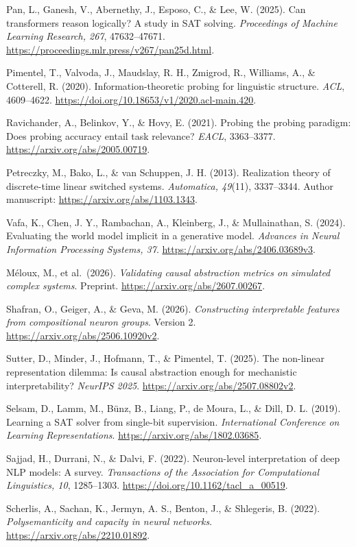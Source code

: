 \documentclass[
  british,
  11pt,
  a4paper,
]{article}
\begin{document}
Pan, L., Ganesh, V., Abernethy, J., Esposo, C., \& Lee, W. (2025). Can
transformers reason logically? A study in SAT solving. \emph{Proceedings
of Machine Learning Research, 267}, 47632--47671.
\url{https://proceedings.mlr.press/v267/pan25d.html}.

Pimentel, T., Valvoda, J., Maudslay, R. H., Zmigrod, R., Williams, A.,
\& Cotterell, R. (2020). Information-theoretic probing for linguistic
structure. \emph{ACL}, 4609--4622.
\url{https://doi.org/10.18653/v1/2020.acl-main.420}.

Ravichander, A., Belinkov, Y., \& Hovy, E. (2021). Probing the probing
paradigm: Does probing accuracy entail task relevance? \emph{EACL},
3363--3377. \url{https://arxiv.org/abs/2005.00719}.

Petreczky, M., Bako, L., \& van Schuppen, J. H. (2013). Realization
theory of discrete-time linear switched systems. \emph{Automatica,
49}(11), 3337--3344. Author manuscript:
\url{https://arxiv.org/abs/1103.1343}.

Vafa, K., Chen, J. Y., Rambachan, A., Kleinberg, J., \& Mullainathan, S.
(2024). Evaluating the world model implicit in a generative model.
\emph{Advances in Neural Information Processing Systems, 37}.
\url{https://arxiv.org/abs/2406.03689v3}.

Méloux, M., et al.~(2026). \emph{Validating causal abstraction metrics
on simulated complex systems}. Preprint.
\url{https://arxiv.org/abs/2607.00267}.

Shafran, O., Geiger, A., \& Geva, M. (2026). \emph{Constructing
interpretable features from compositional neuron groups}. Version 2.
\url{https://arxiv.org/abs/2506.10920v2}.

Sutter, D., Minder, J., Hofmann, T., \& Pimentel, T. (2025). The
non-linear representation dilemma: Is causal abstraction enough for
mechanistic interpretability? \emph{NeurIPS 2025}.
\url{https://arxiv.org/abs/2507.08802v2}.

Selsam, D., Lamm, M., Bünz, B., Liang, P., de Moura, L., \& Dill, D. L.
(2019). Learning a SAT solver from single-bit supervision.
\emph{International Conference on Learning Representations}.
\url{https://arxiv.org/abs/1802.03685}.

Sajjad, H., Durrani, N., \& Dalvi, F. (2022). Neuron-level
interpretation of deep NLP models: A survey. \emph{Transactions of the
Association for Computational Linguistics, 10}, 1285--1303.
\url{https://doi.org/10.1162/tacl_a_00519}.

Scherlis, A., Sachan, K., Jermyn, A. S., Benton, J., \& Shlegeris, B.
(2022). \emph{Polysemanticity and capacity in neural networks}.
\url{https://arxiv.org/abs/2210.01892}.
\end{document}
